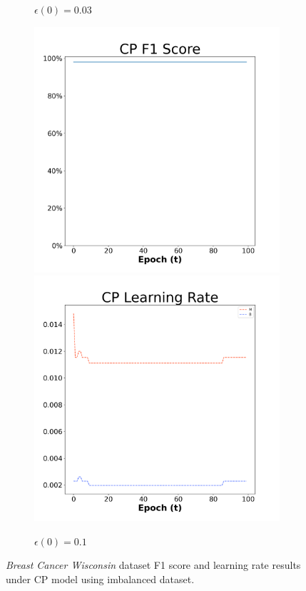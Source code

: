 \begin{figure}[H]
\begin{subfigure}{0.3\textwidth}
  \caption{$\epsilon(0)=0.03$}
\end{subfigure}\hfil %
\begin{subfigure}{0.3\textwidth}
  \includegraphics[width=\linewidth]{images/exper2/breast/CP_0.1_f1.png}
  \includegraphics[width=\linewidth]{images/exper2/breast/CP_0.1_lr.png}
  \caption{$\epsilon(0)=0.1$}
\end{subfigure}

\caption{\textit{Breast Cancer Wisconsin} dataset F1 score and learning rate results under CP model using imbalanced dataset.}
\end{figure}

